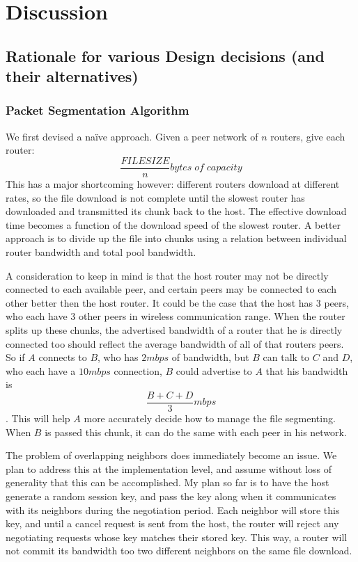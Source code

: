 \documentclass[12pt]{article}
\begin{document}
\newpage
\section{Discussion}

	\subsection{Rationale for various Design decisions (and their alternatives)}

		\subsubsection{Packet Segmentation Algorithm}

			We first devised a na\"{i}ve approach. Given a peer network of $n$ routers, give each router: $$\frac{FILESIZE}{n} bytes\; of\; capacity$$ This has a major shortcoming however: different routers download at different rates, so the file download is not complete until the slowest router has downloaded and transmitted its chunk back to the host. The effective download time becomes a function of the download speed of the slowest router. A better approach is to divide up the file into chunks using a relation between individual router bandwidth and total pool bandwidth.

			A consideration to keep in mind is that the host router may not be directly connected to each available peer, and certain peers may be connected to each other better then the host router. It could be the case that the host has 3 peers, who each have 3 other peers in wireless communication range. When the router splits up these chunks, the advertised bandwidth of a router that he is directly connected too should reflect the average bandwidth of all of that routers peers. So if $A$ connects to $B$, who has $2 mbps$ of bandwidth, but $B$ can talk to $C$ and $D$, who each have a $10 mbps$ connection, $B$ could advertise to $A$ that his bandwidth is $$\frac{B + C + D}{3} mbps$$. This will help $A$ more accurately decide how to manage the file segmenting. When $B$ is passed this chunk, it can do the same with each peer in his network.

			The problem of overlapping neighbors does immediately become an issue. We plan to address this at the implementation level, and assume without loss of generality that this can be accomplished. My plan so far is to have the host generate a random session key, and pass the key along when it communicates with its neighbors during the negotiation period. Each neighbor will store this key, and until a cancel request is sent from the host, the router will reject any negotiating requests whose key matches their stored key. This way, a router will not commit its bandwidth too two different neighbors on the same file download.
\end{document}
